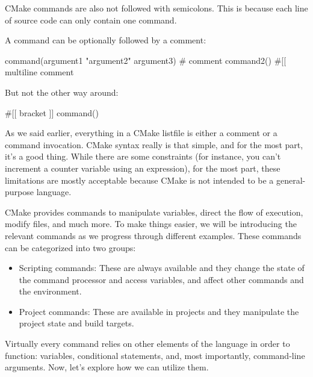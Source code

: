 CMake commands are also not followed with semicolons. This is because each line of source code can only contain one command.

A command can be optionally followed by a comment:

\begin{cmake}
command(argument1 "argument2" argument3) # comment
command2() #[[ multiline comment
\end{cmake}

But not the other way around:

\begin{cmake}
#[[ bracket
]] command()
\end{cmake}

As we said earlier, everything in a CMake listfile is either a comment or a command invocation. CMake syntax really is that simple, and for the most part, it’s a good thing. While there are some constraints (for instance, you can’t increment a counter variable using an expression), for the most part, these limitations are mostly acceptable because CMake is not intended to be a general-purpose language.

CMake provides commands to manipulate variables, direct the flow of execution, modify files, and much more. To make things easier, we will be introducing the relevant commands as we progress through different examples. These commands can be categorized into two groups:

\begin{itemize}
\item
Scripting commands: These are always available and they change the state of the command processor and access variables, and affect other commands and the environment.

\item
Project commands: These are available in projects and they manipulate the project state and build targets.
\end{itemize}

Virtually every command relies on other elements of the language in order to function: variables, conditional statements, and, most importantly, command-line arguments. Now, let’s explore how we can utilize them.














































